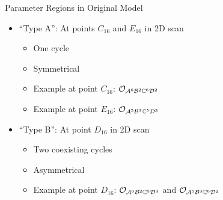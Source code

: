 \begin{frame}{Parameter Regions in Original Model}
    \begin{itemize}
        \item ``Type A'': At points $C_{16}$ and $E_{16}$ in 2D scan
              \begin{itemize}
                  \item One cycle
                  \item Symmetrical
                  \item Example at point $C_{16}$: $\mathcal{O}_{\mathcal{A}^6\mathcal{B}^2\mathbb{C}^6\mathcal{D}^2}$
                  \item Example at point $E_{16}$: $\mathcal{O}_{\mathcal{A}^5\mathcal{B}^3\mathbb{C}^5\mathcal{D}^3}$ \vspace*{1em}
              \end{itemize}
        \item ``Type B'': At point $D_{16}$ in 2D scan
              \begin{itemize}
                  \item Two coexisting cycles
                  \item Asymmetrical
                  \item Example at point $D_{16}$: $\mathcal{O}_{\mathcal{A}^6\mathcal{B}^2\mathbb{C}^5\mathcal{D}^3}$ and $\mathcal{O}_{\mathcal{A}^5\mathcal{B}^3\mathbb{C}^6\mathcal{D}^2}$
              \end{itemize}
    \end{itemize}
\end{frame}
